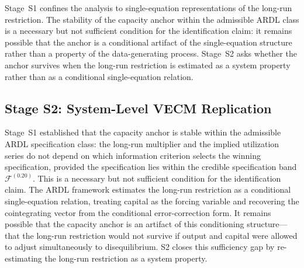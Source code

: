\documentclass[11pt,a4paper]{article}
\begin{document}

Stage~S1 confines the analysis to single-equation representations of the
long-run restriction. The stability of the capacity anchor within the
admissible ARDL class is a necessary but not sufficient condition for the
identification claim: it remains possible that the anchor is a conditional
artifact of the single-equation structure rather than a property of the
data-generating process. Stage~S2 asks whether the anchor survives when the
long-run restriction is estimated as a system property rather than as a
conditional single-equation relation.



\subsection{Stage S2: System-Level VECM Replication}
\label{sec:S2}


Stage~S1 established that the capacity anchor is stable within the admissible
ARDL specification class: the long-run multiplier and the implied utilization
series do not depend on which information criterion selects the winning
specification, provided the specification lies within the credible
specification band $\mathcal{F}^{(0.20)}$. This is a necessary but not
sufficient condition for the identification claim. The ARDL framework
estimates the long-run restriction as a conditional single-equation relation,
treating capital as the forcing variable and recovering the cointegrating
vector from the conditional error-correction form. It remains possible that
the capacity anchor is an artifact of this conditioning structure---that
the long-run restriction would not survive if output and capital were allowed
to adjust simultaneously to disequilibrium. S2 closes this sufficiency gap by
re-estimating the long-run restriction as a system property.

\end{document}

